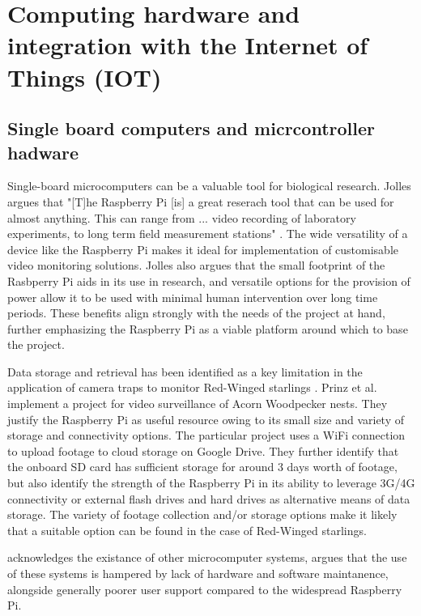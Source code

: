 \documentclass[class=report,11pt,crop=false]{standalone}
\begin{document}
\section{Computing hardware and integration with the Internet of Things (IOT)}

\subsection{Single board computers and micrcontroller hadware}

Single-board microcomputers can be a valuable tool for biological research. Jolles argues that "[T]he Raspberry Pi [is] a great reserach tool that can be used for almost anything. This can range from ... video recording of laboratory experiments, to long term field measurement stations" \cite{jolles2021broad-scale}. The wide versatility of a device like the Raspberry Pi makes it ideal for implementation of customisable video monitoring solutions. Jolles \cite{jolles2021broad-scale} also argues that the small footprint of the Rasbperry Pi aids in its use in research, and versatile options for the provision of power allow it to be used with minimal human intervention over long time periods. These benefits align strongly with the needs of the project at hand, further emphasizing the Raspberry Pi as a viable platform around which to base the project.

Data storage and retrieval has been identified as a key limitation in the application of camera traps to monitor Red-Winged starlings \cite{hofmeyer2024private}. Prinz et al. \cite{prinz2016a} implement a project for video surveillance of Acorn Woodpecker nests. They justify the Raspberry Pi as useful resource owing to its small size and variety of storage and connectivity options. The particular project uses a WiFi connection to upload footage to cloud storage on Google Drive. They further identify that the onboard SD card has sufficient storage for around 3 days worth of footage, but also identify the strength of the Raspberry Pi in its ability to leverage 3G/4G connectivity or external flash drives and hard drives as alternative means of data storage.  The variety of footage collection and/or storage options make it likely that a suitable option can be found in the case of Red-Winged starlings.

\cite{jolles2021broad-scale} acknowledges the existance of other microcomputer systems, argues that the use of these systems is hampered by lack of hardware and software maintanence, alongside generally poorer user support compared to the widespread Raspberry Pi. 
\end{document}
